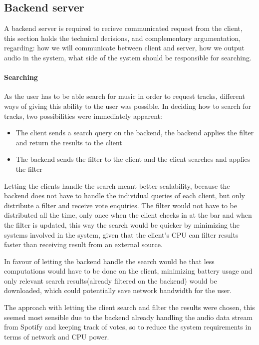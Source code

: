 \subsection{Backend server}

	A backend server is required to recieve communicated request from the client, this section holds the technical decisions, and complementary argumentation, regarding: how we will communicate between client and server, how we output audio in the system, what side of the system should be responsible for searching.

	\paragraph{Searching}
	As the user has to be able search for music in order to request tracks, different ways of giving this ability to the user was possible.
	In deciding how to search for tracks, two possibilities were immediately apparent: 
	\begin{itemize}
		\item The client sends a search query on the backend, the backend applies the filter and return the results to the client 
		\item The backend sends the filter to the client and the client searches and applies the filter
	\end{itemize}
	Letting the clients handle the search meant better scalability, because the backend does not have to handle the individual queries of each client, but only distribute a filter and receive vote enquiries. The filter would not have to be distributed all the time, only once when the client checks in at the bar and when the filter is updated, this way the search would be quicker by minimizing the systems involved in the system, given that the client's CPU can filter results faster than receiving result from an external source. 
	
	In favour of letting the backend handle the search would be that less computations would have to be done on the client, minimizing battery usage and only relevant search results(already filtered on the backend) would be downloaded, which could potentially save network bandwidth for the user. 
	
	The approach with letting the client search and filter the results were chosen, this seemed most sensible due to the backend already handling the audio data stream from Spotify and keeping track of votes, so to reduce the system requirements in terms of network and CPU power.


